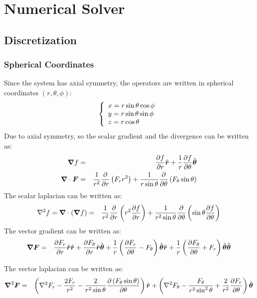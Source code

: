 \section{Numerical Solver}


\subsection{Discretization}
\subsubsection{Spherical Coordinates}
Since the system has axial symmetry, the operators are written in 
spherical coordinates $(r,\theta,\phi)$:
\begin{eqnarray}
\brc{l}{
x = r \sin \theta \cos \phi \\
y = r \sin \theta \sin \phi \\
z = r \cos \theta} 
\end{eqnarray}
Due to axial symmetry, 
so the scalar gradient and the divergence can be written as:
\begin{eqnarray}
\bnabla f &=& \deriv{f}{r}\brhat + \frac{1}{r}\deriv{f}{\theta}\bthetahat \\
\bnabla \cdot \bF &=& \frac{1}{r^2}\deriv{}{r}\pars{F_r r^2 } + 
               \frac{1}{r \sin\theta}\deriv{}{\theta}\pars{F_\theta \sin\theta}
\end{eqnarray}
The scalar laplacian can be written as:
\begin{eqnarray}
\Laplacian f = \bnabla \cdot (\bnabla f)&=& 
 \frac{1}{r^2}\deriv{}{r}\pars{r^2 \deriv{f}{r}} + 
 \frac{1}{r^2 \sin\theta}\deriv{}{\theta}\pars{\sin\theta \deriv{f}{\theta}}
\end{eqnarray}
The vector gradient can be written as:
\begin{eqnarray}
\bnabla \bF &=& \deriv{F_r}{r} \brhat \brhat + \deriv{F_\theta}{r} \brhat \bthetahat + 
\frac{1}{r}\pars{\deriv{F_r}{\theta} - F_\theta} \bthetahat \brhat + 
\frac{1}{r}\pars{\deriv{F_\theta}{\theta} + F_r} \bthetahat \bthetahat
\end{eqnarray}

The vector laplacian can be written as:
\begin{eqnarray}
\bLaplacian \bF &=& 
\left(\Laplacian F_r - \frac{2F_r}{r^2} - 
\frac{2}{r^2 \sin\theta} \deriv{\left(F_\theta \sin\theta \right)}{\theta}\right)\brhat
+ \left(\Laplacian F_\theta - \frac{F_\theta}{r^2 \sin^2\theta} + 
\frac{2}{r^2}\deriv{F_r}{\theta}\right) \bthetahat
\end{eqnarray}

